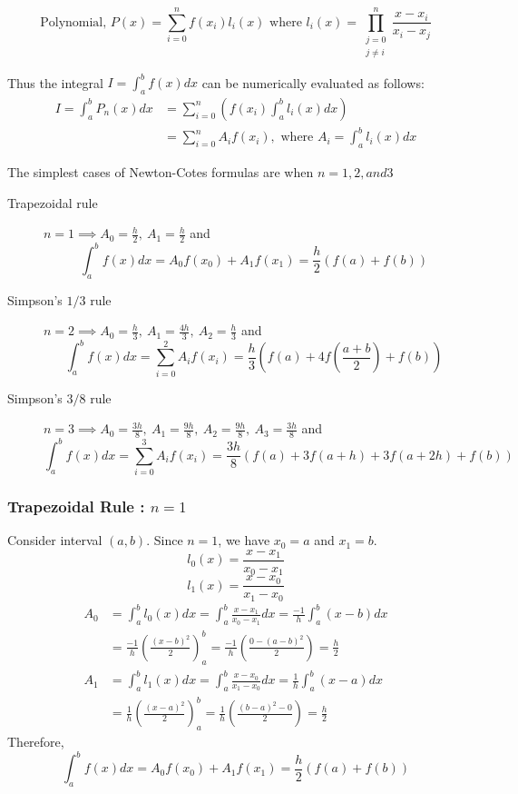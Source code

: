 	\[ \text{Polynomial, }P(x) = \sum_{i =0}^n f(x_i)l_i(x) \text{ where } l_i(x) = \prod_{\substack{j=0\\j\ne i}}^n \frac{x-x_i}{x_i-x_j} \]

	Thus the integral $I = \int_a^b f(x)dx$ can be numerically evaluated as follows:
\begin{align*}
	I = \int_a^b P_n(x)dx &  = \sum_{i = 0}^n \left(f(x_i) \int_a^b l_i(x)dx\right)  \\
		& = \sum_{i=0}^n A_i f(x_i), \text{ where }  A_i = \int_a^b l_i(x) dx 
\end{align*}

	The simplest cases of Newton-Cotes formulas are when $n=1,2, and 3$
\begin{description}
	\item[Trapezoidal rule] $n = 1 \implies A_0 = \frac{h}{2},\ A_1 = \frac{h}{2}$ and
		\[ \int_a^b f(x) dx = A_0f(x_0) + A_1f(x_1) = \frac{h}{2} (f(a) + f(b)) \]
	\item[Simpson's $1/3$ rule] $n = 2 \implies A_0 = \frac{h}{3},\ A_1 = \frac{4h}{3},\ A_2 = \frac{h}{3}$ and 
		\[ \int_a^b f(x) dx = \sum_{i=0}^2 A_if(x_i) = \frac{h}{3} \left(f(a) + 4f\left(\frac{a+b}{2}\right) +  f(b)\right) \]
	\item[Simpson's $3/8$ rule] $n = 3 \implies A_0 = \frac{3h}{8},\ A_1 = \frac{9h}{8},\ A_2 = \frac{9h}{8},\ A_3 = \frac{3h}{8}$ and
		\[ \int_a^b f(x) dx = \sum_{i=0}^3 A_if(x_i) = \frac{3h}{8} (f(a) + 3f(a+h) + 3f(a+2h) + f(b)) \]
\end{description}
\subsubsection{Trapezoidal Rule : $n = 1$}
	Consider interval $(a,b)$.
	Since $n=1$, we have $x_0 = a$ and $x_1 = b$.
	\[ l_0(x) = \frac{x-x_1}{x_0-x_1} \]
	\[ l_1(x) = \frac{x-x_0}{x_1-x_0} \]
	\begin{align*}
		A_0 & = \int_a^b l_0(x) dx = \int_a^b \frac{x-x_1}{x_0-x_1} dx = \frac{-1}{h} \int_a^b (x-b)dx \\
		& = \frac{-1}{h} \left( \frac{(x-b)^2}{2} \right)_a^b = \frac{-1}{h} \left( \frac{0-(a-b)^2}{2} \right) = \frac{h}{2} \\
		A_1 & = \int_a^b l_1(x) dx = \int_a^b \frac{x-x_0}{x_1-x_0} dx = \frac{1}{h} \int_a^b (x-a)dx \\
		& = \frac{1}{h} \left( \frac{(x-a)^2}{2} \right)_a^b = \frac{1}{h} \left( \frac{(b-a)^2-0}{2} \right) = \frac{h}{2}
	\end{align*}
	Therefore,
	\[ \int_a^b f(x) dx = A_0f(x_0) + A_1f(x_1) = \frac{h}{2} (f(a) + f(b)) \]
